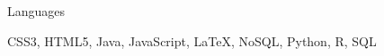 \documentclass[a4paper,9pt]{article}
\begin{document}
\vspace{1ex}	
\begin{minipage}[t]{0.20\linewidth}
	\begin{small}
		\begin{spacing}{1.00}
			\begin{flushright}
				Languages
			\end{flushright}
		\end{spacing}
	\end{small}
\end{minipage}
\hspace{4mm}
\begin{minipage}[t]{0.75\linewidth}
	\begin{small}
		\begin{spacing}{1.00}
			\begin{flushleft}
				CSS3, HTML5, Java, JavaScript, \LaTeX, NoSQL, Python, R, SQL
			\end{flushleft}
		\end{spacing}
	\end{small}
\end{minipage}
\end{document}
